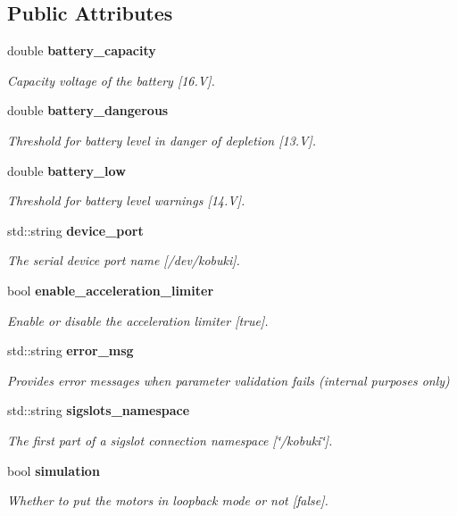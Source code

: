 \subsection*{\-Public \-Attributes}
\begin{DoxyCompactItemize}
\item 
double {\bf battery\-\_\-capacity}
\begin{DoxyCompactList}\small\item\em \-Capacity voltage of the battery [16.\-V]. \end{DoxyCompactList}\item 
double {\bf battery\-\_\-dangerous}
\begin{DoxyCompactList}\small\item\em \-Threshold for battery level in danger of depletion [13.\-V]. \end{DoxyCompactList}\item 
double {\bf battery\-\_\-low}
\begin{DoxyCompactList}\small\item\em \-Threshold for battery level warnings [14.\-V]. \end{DoxyCompactList}\item 
std\-::string {\bf device\-\_\-port}
\begin{DoxyCompactList}\small\item\em \-The serial device port name [/dev/kobuki]. \end{DoxyCompactList}\item 
bool {\bf enable\-\_\-acceleration\-\_\-limiter}
\begin{DoxyCompactList}\small\item\em \-Enable or disable the acceleration limiter [true]. \end{DoxyCompactList}\item 
std\-::string {\bf error\-\_\-msg}
\begin{DoxyCompactList}\small\item\em \-Provides error messages when parameter validation fails (internal purposes only) \end{DoxyCompactList}\item 
std\-::string {\bf sigslots\-\_\-namespace}
\begin{DoxyCompactList}\small\item\em \-The first part of a sigslot connection namespace [\char`\"{}/kobuki\char`\"{}]. \end{DoxyCompactList}\item 
bool {\bf simulation}
\begin{DoxyCompactList}\small\item\em \-Whether to put the motors in loopback mode or not [false]. \end{DoxyCompactList}\end{DoxyCompactItemize}



